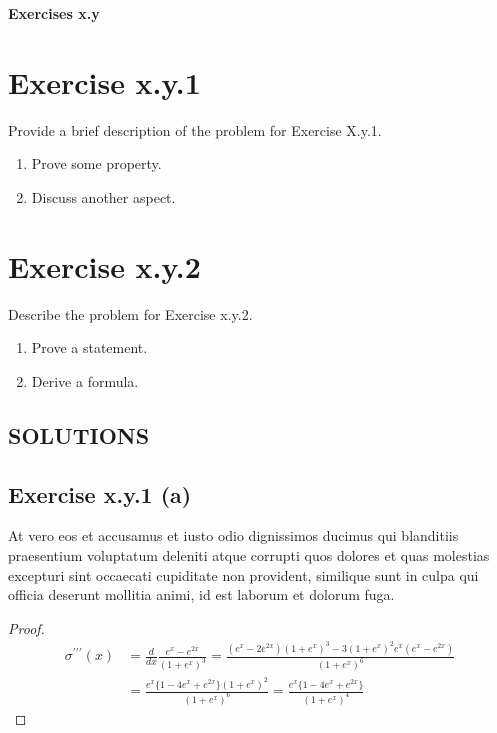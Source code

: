 \documentclass{exam}
\begin{document}
\begin{center}
    \textbf{\Large Exercises x.y }
\end{center}

\section*{Exercise x.y.1}
Provide a brief description of the problem for Exercise X.y.1.
\begin{enumerate}
    \item Prove some property.
    \item Discuss another aspect.
\end{enumerate}

\section*{Exercise x.y.2}
 Describe the problem for Exercise x.y.2.
\begin{enumerate}
    \item Prove a statement.
    \item Derive a formula.
\end{enumerate}


\newpage

\begin{center}    
    \section*{SOLUTIONS}
\end{center}

\subsection*{Exercise x.y.1 (a)}
At vero eos et accusamus et iusto odio dignissimos ducimus qui blanditiis praesentium voluptatum deleniti atque corrupti quos 
dolores et quas molestias excepturi sint occaecati cupiditate non provident, similique sunt in culpa qui officia deserunt mollitia animi, 
id est laborum et dolorum fuga.
\begin{proof}
    \begin{equation*}     
        \begin{aligned}
            \sigma^{\prime\prime\prime}(x) &= \frac{d}{ d x} \frac{e^{x}-e^{2x}}{(1 + e^{x})^3} = \frac{(e^x - 2e^{2x})(1 + e^x)^3 - 3(1 + e^x)^2 e^{x}(e^x - e^{2x})}{(1 + e^x)^6}\\
            &= \frac{e^{x} \{ 1 - 4e^x + e^{2x} \}(1 + e^x)^2}{(1 + e^x)^{6}} = \frac{e^{x} \{ 1 - 4e^x + e^{2x} \}}{(1 + e^x)^{4}}
        \end{aligned}
\end{equation*}
\end{proof}
\end{document}

